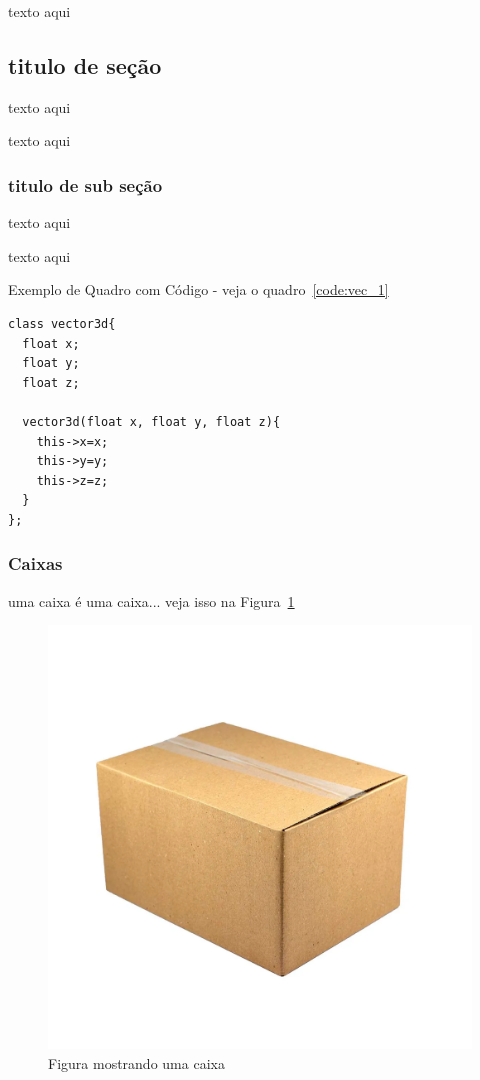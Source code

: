 texto aqui

\subsection{titulo de seção}

texto aqui 

texto aqui 

\subsubsection{titulo de sub seção}
texto aqui 

texto aqui

Exemplo de Quadro com Código - veja o quadro~\ref{code:vec_1}
\begin{lstlisting}[frame=single,caption=Exemplo de vetor 3d\label{code:vec_1}]
class vector3d{
  float x;
  float y;
  float z;

  vector3d(float x, float y, float z){
    this->x=x;
    this->y=y;
    this->z=z;
  }
};
\end{lstlisting}

\subsubsection{Caixas}

uma caixa é uma caixa... veja isso na Figura~\ref{fig:figura1}

\begin{figure}[htb]
  \centering
	\caption{\label{fig:figura1} Figura mostrando uma caixa}
	\includegraphics[scale=0.2]{Imagens/figura1.png} %
\end{figure}




